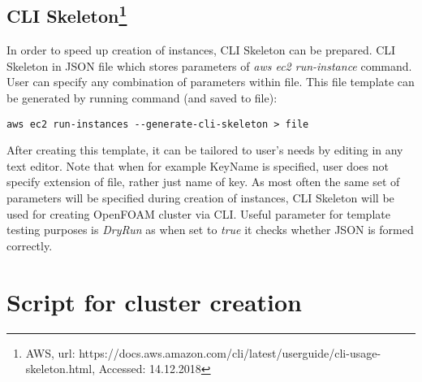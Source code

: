 \documentclass[12pt,english]{article}
\begin{document}
\subsection{CLI Skeleton\footnote{AWS, url: https://docs.aws.amazon.com/cli/latest/userguide/cli-usage-skeleton.html, Accessed: 14.12.2018}}

In order to speed up creation of instances, CLI Skeleton can be prepared. CLI Skeleton in JSON file which stores parameters of \textit{aws ec2 run-instance} command. User can specify any combination of parameters within file. This file template can be generated by running command (and saved to file):
\begin{lstlisting}
aws ec2 run-instances --generate-cli-skeleton > file
\end{lstlisting}
After creating this template, it can be tailored to user's needs by editing in any text editor. Note that when for example KeyName is specified, user does not specify extension of file, rather just name of key. As most often the same set of parameters will be specified during creation of instances, CLI Skeleton will be used for creating OpenFOAM cluster via CLI. Useful parameter for template testing purposes is \textit{DryRun} as when set to \textit{true} it checks whether JSON is formed correctly.

\section{Script for cluster creation}
\end{document}
